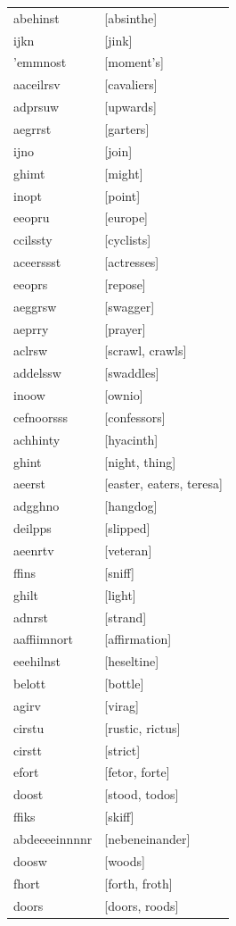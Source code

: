 \documentclass{article}
\begin{document}
\begin{tabular}{ll}
abehinst & [absinthe] \\
ijkn & [jink] \\
'emmnost & [moment's] \\
aaceilrsv & [cavaliers] \\
adprsuw & [upwards] \\
aegrrst & [garters] \\
ijno & [join] \\
ghimt & [might] \\
inopt & [point] \\
eeopru & [europe] \\
ccilssty & [cyclists] \\
aceerssst & [actresses] \\
eeoprs & [repose] \\
aeggrsw & [swagger] \\
aeprry & [prayer] \\
aclrsw & [scrawl, crawls] \\
addelssw & [swaddles] \\
inoow & [ownio] \\
cefnoorsss & [confessors] \\
achhinty & [hyacinth] \\
ghint & [night, thing] \\
aeerst & [easter, eaters, teresa] \\
adgghno & [hangdog] \\
deilpps & [slipped] \\
aeenrtv & [veteran] \\
ffins & [sniff] \\
ghilt & [light] \\
adnrst & [strand] \\
aaffiimnort & [affirmation] \\
eeehilnst & [heseltine] \\
belott & [bottle] \\
agirv & [virag] \\
cirstu & [rustic, rictus] \\
cirstt & [strict] \\
efort & [fetor, forte] \\
doost & [stood, todos] \\
ffiks & [skiff] \\
abdeeeeinnnnr & [nebeneinander] \\
doosw & [woods] \\
fhort & [forth, froth] \\
doors & [doors, roods] \\

\end{tabular}
\end{document}
